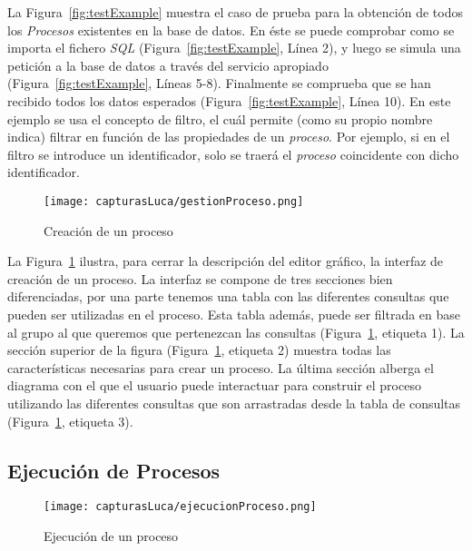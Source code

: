 La Figura~\ref{fig:testExample} muestra el caso de prueba para la obtención de todos los \emph{Procesos} existentes en la base de datos. En éste se puede comprobar como se importa el fichero \emph{SQL} (Figura~\ref{fig:testExample}, Línea 2), y luego se simula una petición a la base de datos a través del servicio apropiado (Figura~\ref{fig:testExample}, Líneas 5-8). Finalmente se comprueba que se han recibido todos los datos esperados (Figura~\ref{fig:testExample}, Línea 10). En este ejemplo se usa el concepto de filtro, el cuál permite (como su propio nombre indica) filtrar en función de las propiedades de un \emph{proceso}. Por ejemplo, si en el filtro se introduce un identificador, solo se traerá el \emph{proceso} coincidente con dicho identificador.

\begin{figure}[H]
	\centering
	\texttt{[image: capturasLuca/gestionProceso.png]}
	\caption{Creación de un proceso}
	\label{fig:gestionProceso}
\end{figure}

La Figura~\ref{fig:gestionProceso} ilustra, para cerrar la descripción del editor gráfico, la interfaz de creación de un proceso. La interfaz se compone de tres secciones bien diferenciadas, por una parte tenemos una tabla con las diferentes consultas que pueden ser utilizadas en el proceso. Esta tabla además, puede ser filtrada en base al grupo al que queremos que pertenezcan las consultas (Figura~\ref{fig:gestionProceso}, etiqueta 1). La sección superior de la figura (Figura~\ref{fig:gestionProceso}, etiqueta 2) muestra todas las características necesarias para crear un proceso. La última sección alberga el diagrama con el que el usuario puede interactuar para construir el proceso utilizando las diferentes consultas que son arrastradas desde la tabla de consultas (Figura~\ref{fig:gestionProceso}, etiqueta 3).

\subsection{Ejecución de Procesos}


\begin{figure}[H]
	\centering
	\texttt{[image: capturasLuca/ejecucionProceso.png]}
	\caption{Ejecución de un proceso}
	\label{fig:ejecucionProceso}
\end{figure}

